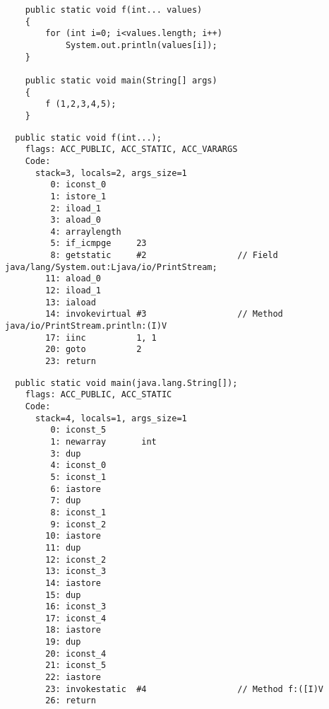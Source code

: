 

\begin{lstlisting}
	public static void f(int... values)
	{
		for (int i=0; i<values.length; i++)
			System.out.println(values[i]);
	}

	public static void main(String[] args) 
	{
		f (1,2,3,4,5);
	}
\end{lstlisting}

\begin{lstlisting}
  public static void f(int...);
    flags: ACC_PUBLIC, ACC_STATIC, ACC_VARARGS
    Code:
      stack=3, locals=2, args_size=1
         0: iconst_0      
         1: istore_1      
         2: iload_1       
         3: aload_0       
         4: arraylength   
         5: if_icmpge     23
         8: getstatic     #2                  // Field java/lang/System.out:Ljava/io/PrintStream;
        11: aload_0       
        12: iload_1       
        13: iaload        
        14: invokevirtual #3                  // Method java/io/PrintStream.println:(I)V
        17: iinc          1, 1
        20: goto          2
        23: return        
\end{lstlisting}


\begin{lstlisting}
  public static void main(java.lang.String[]);
    flags: ACC_PUBLIC, ACC_STATIC
    Code:
      stack=4, locals=1, args_size=1
         0: iconst_5      
         1: newarray       int
         3: dup           
         4: iconst_0      
         5: iconst_1      
         6: iastore       
         7: dup           
         8: iconst_1      
         9: iconst_2      
        10: iastore       
        11: dup           
        12: iconst_2      
        13: iconst_3      
        14: iastore       
        15: dup           
        16: iconst_3      
        17: iconst_4      
        18: iastore       
        19: dup           
        20: iconst_4      
        21: iconst_5      
        22: iastore       
        23: invokestatic  #4                  // Method f:([I)V
        26: return        
\end{lstlisting}

